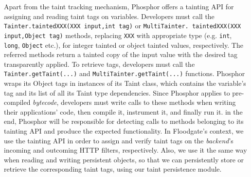 Apart from the taint tracking mechanism, Phosphor offers a tainting API for assigning and reading taint tags on variables. Developers must call the \texttt{Tainter.taintedXXX(XXX input,int tag)} or \texttt{MultiTainter.
taintedXXX(XXX input,Object tag)} methods, replacing \texttt{XXX} with appropriate
type (e.g. \texttt{int}, \texttt{long}, \texttt{Object} etc.), for integer tainted or object tainted values, respectively. The referred methods return a tainted copy of the input value with the desired tag transparently applied. To retrieve tags, developers must call the \texttt{Tainter.getTaint(...)} and \texttt{MultiTainter.getTaint(...)} functions. Phosphor wraps its Object tags in instances of its Taint class, which contains the variable's tag and its list of all its Taint type dependencies. Since Phosphor applies to pre-compiled \textit{bytecode}, developers must write calls to these methods when writing their applications' code, then compile it, instrument it, and finally run it. in the end, Phosphor will be responsible for detecting calls to methods belonging to its tainting API and produce the expected functionality. In Floodgate's context, we use the tainting API in order to assign and verify taint tags on the \textit{backend}'s incoming and outcoming HTTP filters, respectively. Also, we use it the same way when reading and writing persistent objects, so that we can persistently store or retrieve the corresponding taint tags, using our taint persistence module.

 

